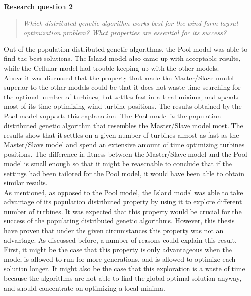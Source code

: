 \noindent \textbf{Research question 2}

\begin{quote}
\textit{Which distributed genetic algorithm works best for the wind farm layout optimization problem? What properties are essential for its success?}
\end{quote}


\noindent Out of the population distributed genetic algorithms, the Pool model was able to find the best solutions. The Island model also came up with acceptable results, while the Cellular model had trouble keeping up with the other models.\\

\noindent Above it was discussed that the property that made the Master/Slave model superior to the other models could be that it does not waste time searching for the optimal number of turbines, but settles fast in a local minima, and spends most of its time optimizing wind turbine positions. The results obtained by the Pool model supports this explanation. The Pool model is the population distributed genetic algorithm that resembles the Master/Slave model most. The results show that it settles on a given number of turbines almost as fast as the Master/Slave model and spend an extensive amount of time optimizing turbines positions. The difference in fitness between the Master/Slave model and the Pool model is small enough so that it might be reasonable to conclude that if the settings had been tailored for the Pool model, it would have been able to obtain similar results.\\

\noindent As mentioned, as opposed to the Pool model, the Island model was able to take advantage of its population distributed property by using it to explore different number of turbines. It was expected that this property would be crucial for the success of the populating distributed genetic algorithms. However, this thesis have proven that under the given circumstances this property was not an advantage. As discussed before, a number of reasons could explain this result. First, it might be the case that this property is only advantageous when the model is allowed to run for more generations, and is allowed to optimize each solution longer. It might also be the case that this exploration is a waste of time because the algorithms are not able to find the global optimal solution anyway, and should concentrate on optimizing a local minima.\\

